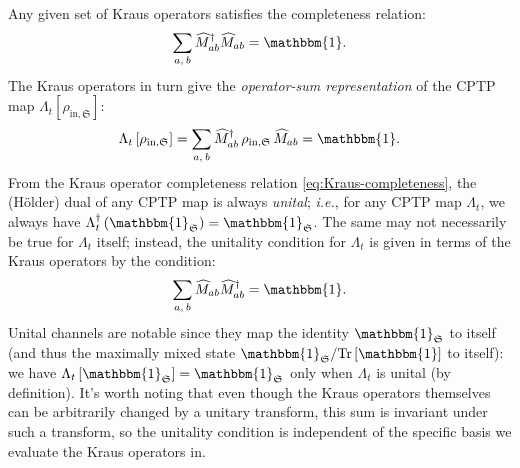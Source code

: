 \documentclass[preprints,article,accept,moreauthors,pdftex]{Definitions/mdpi}
\begin{document}
\begin{paracol}{2}
Any given set of Kraus operators satisfies the completeness relation:
\begin{equation}
    \label{eq:Kraus-completeness}
    \sum_{a,\:b}\widehat{M}_{ab}^{\dagger}\widehat{M}_{ab} = \mathbbm{1}.
\end{equation}
The Kraus operators in turn give the \emph{operator-sum representation} of the CPTP map $\Lambda_{t}\left[\rho_{\mathrm{in},\mathfrak{S}}\right]$:
\begin{equation}
    \label{eq:op-sum-rep}
    \Lambda_{t}\left[\rho_{\mathrm{in},\mathfrak{S}}\right] = \sum_{a,\:b}\widehat{M}_{ab}^{\dagger}\,\rho_{\mathrm{in},\mathfrak{S}}\,\widehat{M}_{ab} = \mathbbm{1}.
\end{equation}
From the Kraus operator completeness relation \eqref{eq:Kraus-completeness}, the (Hölder) dual of any CPTP map is always \emph{unital}; \emph{i.e.}, for any CPTP map $\Lambda_{t}$, we always have $\Lambda_{t}^{\dagger}\left(\mathbbm{1}_{\mathfrak{S}}\right) = \mathbbm{1}_{\mathfrak{S}}$. The same may not necessarily be true for $\Lambda_{t}$ itself; instead, the unitality condition for $\Lambda_{t}$ is given in terms of the Kraus operators by the condition:
\begin{equation}
    \label{eq:Kraus-unitality-requirement}
    \sum_{a,\:b}\widehat{M}_{ab}\widehat{M}_{ab}^{\dagger} = \mathbbm{1}.
\end{equation}
Unital channels are notable since they map the identity $\mathbbm{1}_{\mathfrak{S}}$ to itself (and thus the maximally mixed state $\mathbbm{1}_{\mathfrak{S}}/\mathrm{Tr}\left[\mathbbm{1}\right]$ to itself): we have  $\Lambda_{t}\left[\mathbbm{1}_{\mathfrak{S}}\right] = \mathbbm{1}_{\mathfrak{S}}$ only when $\Lambda_{t}$ is unital (by definition). It's worth noting that even though the Kraus operators themselves can be arbitrarily changed by a unitary transform, this sum is invariant under such a transform, so the unitality condition is independent of the specific basis we evaluate the Kraus operators in.


\end{paracol}
\end{document}
